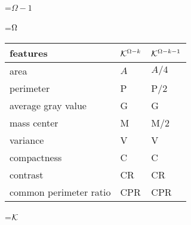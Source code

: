 {\newpage
\clearpage
\samepage \setbox\sizebox=\hbox{$\Omega
 -1$}\box\sizebox
}

{\newpage
\clearpage
\samepage \setbox\sizebox=\hbox{$\Omega$}\box\sizebox
}

{\newpage
\clearpage
\samepage \begin{table}\begin{center}
 
\begin{tabular}{||l||l|l||}\hline \hline
features & ${\cal{K}}^{\Omega
 -k}$ & ${\cal{K}}^{\Omega
 -k-1}$ \\  \hline \hline
area & $A$ & $A/4$ \\ 
perimeter & P & P/2\\ 
average gray value &G & G\\ 
mass center & M & M/2 \\ 
variance &V&V \\ 
compactness &C & C\\  \hline
contrast &CR & CR \\ 
common perimeter ratio & CPR & CPR\\  \hline \hline
\end{tabular}
\end{center}
 

\label{tab:rules_know}
\end{table}
}

{\newpage
\clearpage
\samepage \setbox\sizebox=\hbox{${\cal{K}}$}\box\sizebox
}

